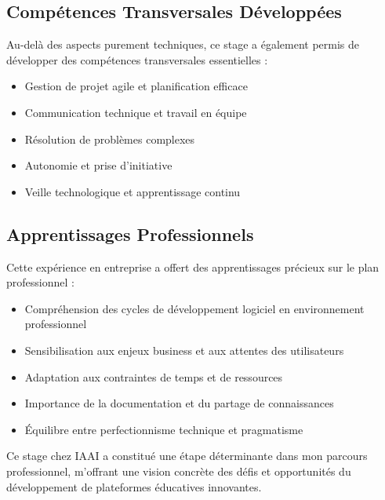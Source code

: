 \subsection{Compétences Transversales Développées}
Au-delà des aspects purement techniques, ce stage a également permis de développer des compétences transversales essentielles :

\begin{itemize}
  \item Gestion de projet agile et planification efficace
  \item Communication technique et travail en équipe
  \item Résolution de problèmes complexes
  \item Autonomie et prise d'initiative
  \item Veille technologique et apprentissage continu
\end{itemize}

\subsection{Apprentissages Professionnels}
Cette expérience en entreprise a offert des apprentissages précieux sur le plan professionnel :

\begin{itemize}
  \item Compréhension des cycles de développement logiciel en environnement professionnel
  \item Sensibilisation aux enjeux business et aux attentes des utilisateurs
  \item Adaptation aux contraintes de temps et de ressources
  \item Importance de la documentation et du partage de connaissances
  \item Équilibre entre perfectionnisme technique et pragmatisme
\end{itemize}

Ce stage chez IAAI a constitué une étape déterminante dans mon parcours professionnel, m'offrant une vision concrète des défis et opportunités du développement de plateformes éducatives innovantes. 